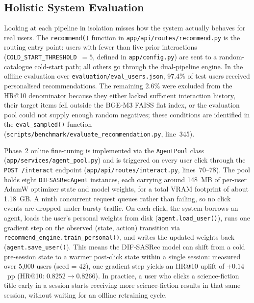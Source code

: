
\subsection{Holistic System Evaluation}
\label{subsec:holistic-eval}

Looking at each pipeline in isolation misses how the system actually behaves for real users.
The \texttt{recommend()} function in \texttt{app/api/routes/recommend.py} is the routing entry point: users with fewer than five prior interactions (\texttt{COLD\_START\_THRESHOLD}~$=5$, defined in \texttt{app/config.py}) are sent to a random-catalogue cold-start path; all others go through the dual-pipeline engine.
In the offline evaluation over \texttt{evaluation/eval\_users.json}, 97.4\% of test users received personalised recommendations. The remaining 2.6\% were excluded from the HR@10 denominator because they either lacked sufficient interaction history, their target items fell outside the BGE-M3 FAISS flat index, or the evaluation pool could not supply enough random negatives; these conditions are identified in the \texttt{eval\_sampled()} function (\texttt{scripts/benchmark/evaluate\_recommendation.py}, line~345).

Phase~2 online fine-tuning is implemented via the \texttt{AgentPool} class (\texttt{app/services/agent\_pool.py}) and is triggered on every user click through the \texttt{POST /interact} endpoint (\texttt{app/api/routes/interact.py}, lines~70--78).
The pool holds eight \texttt{DIFSASRecAgent} instances, each carrying around 148~MB of per-user AdamW optimizer state and model weights, for a total VRAM footprint of about 1.18~GB. A ninth concurrent request queues rather than failing, so no click events are dropped under bursty traffic.
On each click, the system borrows an agent, loads the user's personal weights from disk (\texttt{agent.load\_user()}), runs one gradient step on the observed (state, action) transition via \texttt{recommend\_engine.train\_personal()}, and writes the updated weights back (\texttt{agent.save\_user()}).
This means the DIF-SASRec model can shift from a cold pre-session state to a warmer post-click state within a single session: measured over 5,000 users (seed = 42), one gradient step yields an HR@10 uplift of $+0.14$~pp (HR@10: $0.8252 \to 0.8266$).
In practice, a user who clicks a science-fiction title early in a session starts receiving more science-fiction results in that same session, without waiting for an offline retraining cycle.

